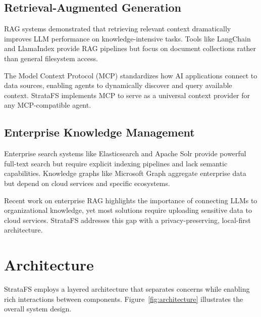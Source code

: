 \documentclass[conference]{IEEEtran}
\begin{document}
\subsection{Retrieval-Augmented Generation}

RAG systems \cite{lewis2020retrieval} demonstrated that retrieving relevant context dramatically improves LLM performance on knowledge-intensive tasks. Tools like LangChain and LlamaIndex provide RAG pipelines but focus on document collections rather than general filesystem access.

The Model Context Protocol (MCP) \cite{anthropic2024mcp} standardizes how AI applications connect to data sources, enabling agents to dynamically discover and query available context. StrataFS implements MCP to serve as a universal context provider for any MCP-compatible agent.

\subsection{Enterprise Knowledge Management}

Enterprise search systems like Elasticsearch and Apache Solr provide powerful full-text search but require explicit indexing pipelines and lack semantic capabilities. Knowledge graphs like Microsoft Graph aggregate enterprise data but depend on cloud services and specific ecosystems.

Recent work on enterprise RAG \cite{gao2023retrieval} highlights the importance of connecting LLMs to organizational knowledge, yet most solutions require uploading sensitive data to cloud services. StrataFS addresses this gap with a privacy-preserving, local-first architecture.

\section{Architecture}

StrataFS employs a layered architecture that separates concerns while enabling rich interactions between components. Figure~\ref{fig:architecture} illustrates the overall system design.
\end{document}
